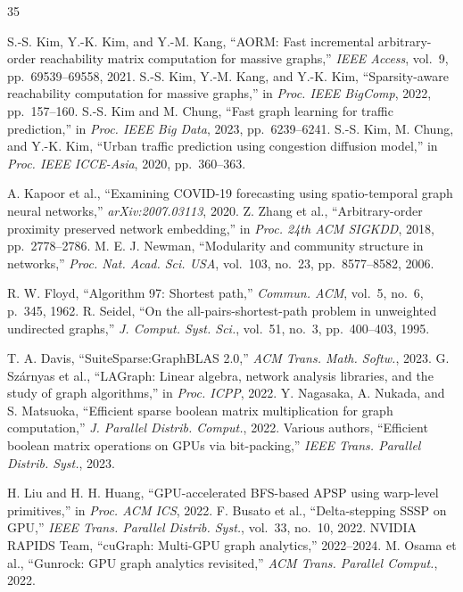 \documentclass[journal]{IEEEtran}
\begin{document}
\balance

\begin{thebibliography}{35}

 S.-S. Kim, Y.-K. Kim, and Y.-M. Kang, ``AORM: Fast incremental arbitrary-order reachability matrix computation for massive graphs,'' \emph{IEEE Access}, vol.~9, pp.~69539--69558, 2021.
 S.-S. Kim, Y.-M. Kang, and Y.-K. Kim, ``Sparsity-aware reachability computation for massive graphs,'' in \emph{Proc. IEEE BigComp}, 2022, pp.~157--160.
 S.-S. Kim and M. Chung, ``Fast graph learning for traffic prediction,'' in \emph{Proc. IEEE Big Data}, 2023, pp.~6239--6241.
 S.-S. Kim, M. Chung, and Y.-K. Kim, ``Urban traffic prediction using congestion diffusion model,'' in \emph{Proc. IEEE ICCE-Asia}, 2020, pp.~360--363.

 A. Kapoor et al., ``Examining COVID-19 forecasting using spatio-temporal graph neural networks,'' \emph{arXiv:2007.03113}, 2020.
 Z. Zhang et al., ``Arbitrary-order proximity preserved network embedding,'' in \emph{Proc. 24th ACM SIGKDD}, 2018, pp.~2778--2786.
 M. E. J. Newman, ``Modularity and community structure in networks,'' \emph{Proc. Nat. Acad. Sci. USA}, vol.~103, no.~23, pp.~8577--8582, 2006.

 R. W. Floyd, ``Algorithm 97: Shortest path,'' \emph{Commun. ACM}, vol.~5, no.~6, p.~345, 1962.
 R. Seidel, ``On the all-pairs-shortest-path problem in unweighted undirected graphs,'' \emph{J. Comput. Syst. Sci.}, vol.~51, no.~3, pp.~400--403, 1995.

 T. A. Davis, ``SuiteSparse:GraphBLAS 2.0,'' \emph{ACM Trans. Math. Softw.}, 2023.
 G. Sz\'{a}rnyas et al., ``LAGraph: Linear algebra, network analysis libraries, and the study of graph algorithms,'' in \emph{Proc. ICPP}, 2022.
 Y. Nagasaka, A. Nukada, and S. Matsuoka, ``Efficient sparse boolean matrix multiplication for graph computation,'' \emph{J. Parallel Distrib. Comput.}, 2022.
 Various authors, ``Efficient boolean matrix operations on GPUs via bit-packing,'' \emph{IEEE Trans. Parallel Distrib. Syst.}, 2023.

 H. Liu and H. H. Huang, ``GPU-accelerated BFS-based APSP using warp-level primitives,'' in \emph{Proc. ACM ICS}, 2022.
 F. Busato et al., ``Delta-stepping SSSP on GPU,'' \emph{IEEE Trans. Parallel Distrib. Syst.}, vol.~33, no.~10, 2022.
 NVIDIA RAPIDS Team, ``cuGraph: Multi-GPU graph analytics,'' 2022--2024.
 M. Osama et al., ``Gunrock: GPU graph analytics revisited,'' \emph{ACM Trans. Parallel Comput.}, 2022.


\end{thebibliography}
\end{document}
